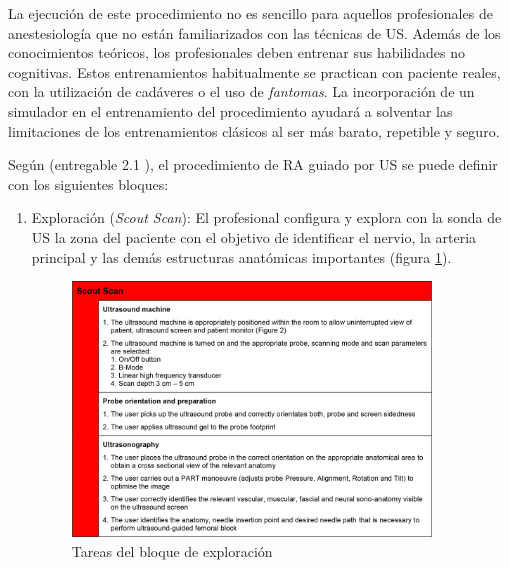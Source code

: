 La ejecución de este procedimiento no es sencillo para aquellos profesionales de anestesiología que no están familiarizados con las técnicas de \ac{US}. Además de los conocimientos teóricos, los profesionales deben entrenar sus habilidades no cognitivas. Estos entrenamientos habitualmente se practican con paciente reales, con la utilización de cadáveres\cite{Tsui2007} o el uso de \emph{fantomas}\cite{phantomra}. La incorporación de un simulador en el entrenamiento del procedimiento ayudará a solventar las limitaciones de los entrenamientos clásicos al ser más barato, repetible y seguro.


Según (entregable 2.1 \cite{rasimasweb}), el procedimiento de \ac{RA} guiado por \ac{US} se puede definir con los siguientes bloques:
\begin{enumerate}
    \item Exploración (\emph{Scout Scan}): El profesional configura y explora con la sonda de \ac{US} la zona del paciente con el objetivo de identificar el nervio, la arteria principal y las demás estructuras anatómicas importantes (figura \ref{fig:scoutscan}). 
\begin{figure}[th]
   \centering
    \includegraphics[width=0.9\textwidth]{IMG/scoutscan.png}
    \caption{Tareas del bloque de exploración }
   \label{fig:scoutscan}
   

\end{figure}
\end{enumerate}
